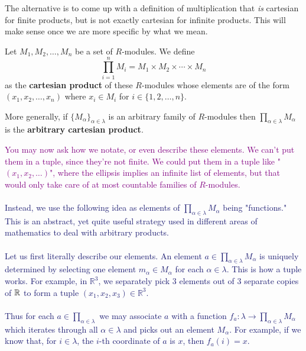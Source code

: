 The alternative is to come up with a definition of multiplication
that \textit{is} cartesian for finite products, but is not exactly
cartesian for infinite products. This will make sense once we are
more specific by what we mean.

\begin{definition}
    Let $M_1, M_2, \dots, M_n$ be a set of $R$-modules. We define
    \[
        \prod_{i = 1}^{n}M_i =  M_1\times M_2 \times \cdots \times M_n 
    \]
    as the \textbf{cartesian product} of these $R$-modules whose
    elements are of the form $(x_1, x_2, \dots, x_n)$ where $x_i
    \in M_i$ for $i \in \{1, 2, \dots, n\}$. 
    
    More generally, if
    $\{M_\alpha\}_{\alpha \in \lambda}$ is an arbitrary family of
    $R$-modules then $\displaystyle \prod_{\alpha \in \lambda}
    M_\alpha$ is the \textbf{arbitrary cartesian product}. 

    \textcolor{purple}{You may now ask how we notate, or even
    describe these elements. We can't put them in a tuple, since
    they're not finite. We could put them in a tuple like "$(x_1,
    x_2, \dots)$", where the ellipsis implies an infinite list of
    elements, but that would only take care of at most countable
    families of $R$-modules.
    }
    \textcolor{MidnightBlue}{
    \\
    \\
    \indent Instead, we use the following idea as elements of
    $\displaystyle \prod_{\alpha \in \lambda} M_\alpha$ being
    "functions." This is an abstract, yet quite useful strategy
    used in different areas of mathematics to deal with arbitrary
    products. 
    \\
    \\
    \indent Let us first literally describe our elements. An
    element $\displaystyle a \in \prod_{\alpha \in \lambda}
    M_\alpha$ is uniquely determined by selecting one element
    $m_\alpha \in M_\alpha$ for each $\alpha \in \lambda$. This is
    how a tuple works. For example, in $\mathbb{R}^3$, we
    separately pick 3 elements out of 3 separate copies of $\mathbb{R}$ to
    form a tuple $(x_1, x_2, x_3) \in \mathbb{R}^3$.
    \\
    \\
    Thus for each $\displaystyle a \in \prod_{\alpha \in \lambda}$ we may
    associate $a$ with a function $f_a: \lambda \to \prod_{\alpha
    \in \lambda}M_\alpha$ which iterates through all $\alpha \in \lambda$ and
    picks out an element $M_\alpha$. For example, if we know that,
    for
    $i \in \lambda$, the $i$-th coordinate of $a$ is $x$, then $f_a(i) =
    x$. 
    }
    \begin{center}
\end{center}
\end{definition}
